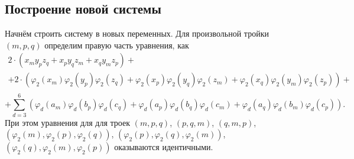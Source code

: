 \documentclass[12pt]{article}
\begin{document}
    \subsection{Построение новой системы}\label{subsec:--}
    Начнём строить систему в новых переменных.
    Для произвольной тройки $ (m, p, q) $ определим правую часть уравнения, как
    \begin{gather*}
        2\cdot (x_{m} y_{p} z_{q}+x_{p} y_{q} z_{m}+x_{q} y_{m} z_{p}) +\\
        +2 \cdot (\varphi_2 (x_m) \varphi_2 (y_p) \varphi_2 (z_q)+ \varphi_2 (x_p) \varphi_2 (y_q) \varphi_2 (z_m)+ \varphi_2 (x_q) \varphi_2 (y_m) \varphi_2 (z_p))+\\
    \end{gather*}
    \begin{equation}
        +\sum_{d=3}^{6} (\varphi_d (a_m) \varphi_d (b_p) \varphi_d (c_q)+ \varphi_d (a_p) \varphi_d (b_q) \varphi_d (c_m) + \varphi_d (a_q) \varphi_d (b_m) \varphi_d (c_p)).\label{eq:13}
    \end{equation}
    При этом уравнения для для троек
    $(m, p, q)$, $(p, q, m)$, $(q, m, p)$,
    $(\varphi_2 (m), \varphi_2(p), \varphi_2(q))$, $(\varphi_2 (p), \varphi_2(q), \varphi_2(m))$, $(\varphi_2 (q), \varphi_2(m), \varphi_2(p))$
    оказываются идентичными.
\end{document}

